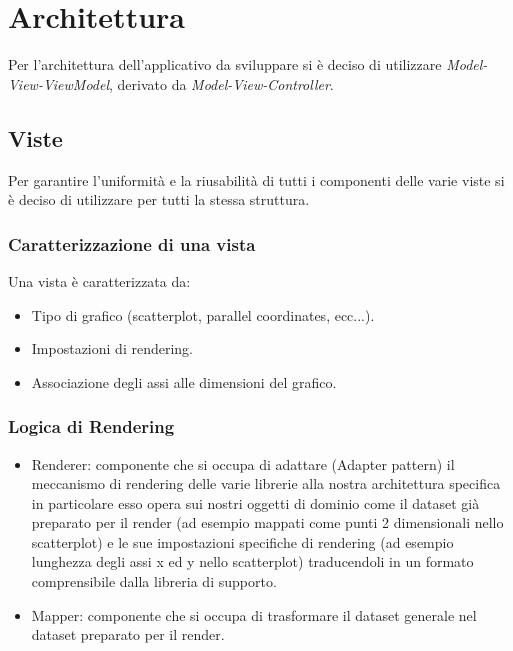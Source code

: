 \section{Architettura}

Per l'architettura dell'applicativo da sviluppare si è deciso di utilizzare
\textit{Model-View-ViewModel}, derivato da \textit{Model-View-Controller}.

\subsection{Viste}
Per garantire l'uniformità e la riusabilità di tutti i componenti delle varie
viste si è deciso di utilizzare per tutti la stessa struttura.

\subsubsection{Caratterizzazione di una vista}
Una vista è caratterizzata da:
\begin{itemize}
  \item Tipo di grafico (scatterplot, parallel coordinates, ecc...).
  \item Impostazioni di rendering.
  \item Associazione degli assi alle dimensioni del grafico.
\end{itemize}

\subsubsection{Logica di Rendering}
\begin{itemize}
  \item Renderer: componente che si occupa di adattare (Adapter pattern) il
    meccanismo di rendering delle varie librerie alla nostra architettura
    specifica in particolare esso opera sui nostri oggetti di dominio come il 
    dataset già preparato per il render (ad esempio mappati come punti 2 
    dimensionali nello scatterplot) e le sue impostazioni specifiche di 
    rendering (ad esempio lunghezza degli assi x ed y nello scatterplot)
    traducendoli in un formato comprensibile dalla libreria di supporto.
  \item Mapper: componente che si occupa di trasformare il dataset generale nel
    dataset preparato per il render.
\end{itemize}

